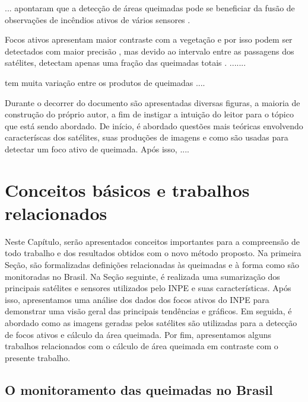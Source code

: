 \documentclass[cic,tc]{iiufrgs}
\begin{document}
... apontaram que a detecção de áreas queimadas pode se beneficiar da fusão de observações de incêndios ativos de vários sensores \citep{giglio2010assessing}.

Focos ativos apresentam maior contraste com a vegetação e por isso podem ser detectados com maior precisão \citep{GIGLIO2016}, mas devido ao intervalo entre as passagens dos satélites, detectam apenas uma fração das queimadas totais \citep{HANTSON2013, giglio2009active}. .......

tem muita variação entre os produtos de queimadas .... \citep{Boschetti2004}

\citep{Humber2019} 


Durante o decorrer do documento são apresentadas diversas figuras, a maioria de construção do próprio autor, a fim de instigar a intuição do leitor para o tópico que está sendo abordado. De início, é abordado questões mais teóricas envolvendo caracteríscas dos satélites, suas produções de imagens e como são usadas para detectar um foco ativo de queimada. Após isso, .... \par



\chapter{Conceitos básicos e trabalhos relacionados}

Neste Capítulo, serão apresentados conceitos importantes para a compreensão de todo trabalho e dos resultados obtidos com o novo método proposto. Na primeira Seção, são formalizadas definições relacionadas às queimadas e à forma como são monitoradas no Brasil. Na Seção seguinte, é realizada uma sumarização dos principais satélites e sensores utilizados pelo INPE e suas características. Após isso, apresentamos uma análise dos dados dos focos ativos do INPE para demonstrar uma visão geral das principais tendências e gráficos. Em seguida, é abordado como as imagens geradas pelos satélites são utilizadas para a detecção de focos ativos e cálculo da área queimada. Por fim, apresentamos alguns trabalhos relacionados com o cálculo de área queimada em contraste com o presente trabalho. \par

\section{O monitoramento das queimadas no Brasil}
\end{document}
